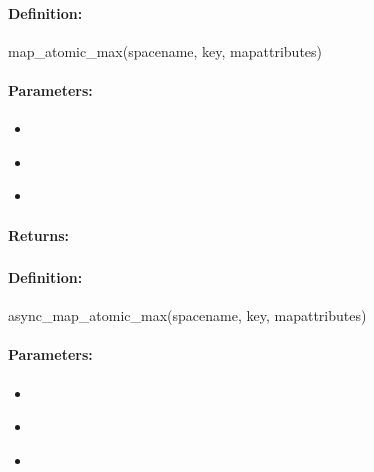 \paragraph{Definition:}
\begin{rubycode}
map_atomic_max(spacename, key, mapattributes)
\end{rubycode}

\paragraph{Parameters:}
\begin{itemize}[noitemsep]
\item {}\\

\item {}\\

\item {}\\

\end{itemize}

\paragraph{Returns:}


\pagebreak
\subsubsection{}
\label{api:ruby:async_map_atomic_max}


\paragraph{Definition:}
\begin{rubycode}
async_map_atomic_max(spacename, key, mapattributes)
\end{rubycode}

\paragraph{Parameters:}
\begin{itemize}[noitemsep]
\item {}\\

\item {}\\

\item {}\\

\end{itemize}

